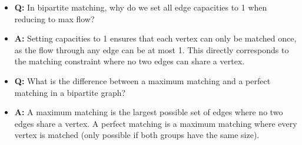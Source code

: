 \documentclass[11pt,a4paper]{article}
\begin{document}
\begin{multicols}{2}
\begin{itemize}
    \item \textbf{Q:} In bipartite matching, why do we set all edge capacities to 1 when reducing to max flow?
    \item \textbf{A:} Setting capacities to 1 ensures that each vertex can only be matched once, as the flow through any edge can be at most 1. This directly corresponds to the matching constraint where no two edges can share a vertex.

    \item \textbf{Q:} What is the difference between a maximum matching and a perfect matching in a bipartite graph?
    \item \textbf{A:} A maximum matching is the largest possible set of edges where no two edges share a vertex. A perfect matching is a maximum matching where every vertex is matched (only possible if both groups have the same size).
\end{itemize}

\end{multicols}
\end{document}
